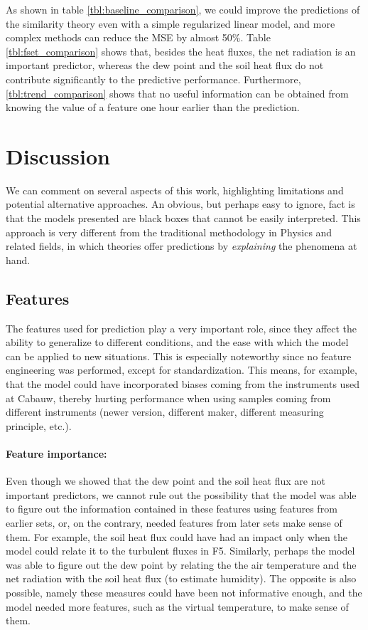 \documentclass[a4paper]{book}
\begin{document}
As shown in table \ref{tbl:baseline_comparison}, we could improve the predictions of the similarity theory even with a simple regularized linear model, and more complex methods can reduce the MSE by almost 50\%. Table \ref{tbl:fset_comparison} shows that, besides the heat fluxes, the net radiation is an important predictor, whereas the dew point and the soil heat flux do not contribute significantly to the predictive performance. Furthermore, \ref{tbl:trend_comparison} shows that no useful information can be obtained from knowing the value of a feature one hour earlier than the prediction.

\section{Discussion}
We can comment on several aspects of this work, highlighting limitations and potential alternative approaches. An obvious, but perhaps easy to ignore, fact is that the models presented are black boxes that cannot be easily interpreted. This approach is very different from the traditional methodology in Physics and related fields, in which theories offer predictions by \emph{explaining} the phenomena at hand. 

\subsection{Features}
The features used for prediction play a very important role, since they affect the ability to generalize to different conditions, and the ease with which the model can be applied to new situations. This is especially noteworthy since no feature engineering was performed, except for standardization. This means, for example, that the model could have incorporated biases coming from the instruments used at Cabauw, thereby hurting performance when using samples coming from different instruments (newer version, different maker, different measuring principle, etc.).

\paragraph{Feature importance:} Even though we showed that the dew point and the soil heat flux are not important predictors, we cannot rule out the possibility that the model was able to figure out the information contained in these features using features from earlier sets, or, on the contrary, needed features from later sets make sense of them. For example, the soil heat flux could have had an impact only when the model could relate it to the turbulent fluxes in F5. Similarly, perhaps the model was able to figure out the dew point by relating the the air temperature and the net radiation with the soil heat flux (to estimate humidity). The opposite is also possible, namely these measures could have been not informative enough, and the model needed more features, such as the virtual temperature, to make sense of them.
\end{document}

